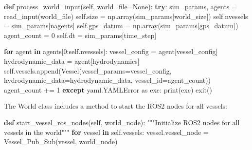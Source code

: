 \documentclass[
  letterpaper,
  DIV=11,
  numbers=noendperiod]{scrreprt}
\newenvironment{Shaded}{\begin{snugshade}}{\end{snugshade}}
\newcommand{\BuiltInTok}[1]{\textcolor[rgb]{0.00,0.23,0.31}{#1}}
\newcommand{\CommentTok}[1]{\textcolor[rgb]{0.37,0.37,0.37}{#1}}
\newcommand{\ControlFlowTok}[1]{\textcolor[rgb]{0.00,0.23,0.31}{\textbf{#1}}}
\newcommand{\DecValTok}[1]{\textcolor[rgb]{0.68,0.00,0.00}{#1}}
\newcommand{\ImportTok}[1]{\textcolor[rgb]{0.00,0.46,0.62}{#1}}
\newcommand{\KeywordTok}[1]{\textcolor[rgb]{0.00,0.23,0.31}{\textbf{#1}}}
\newcommand{\NormalTok}[1]{\textcolor[rgb]{0.00,0.23,0.31}{#1}}
\newcommand{\OperatorTok}[1]{\textcolor[rgb]{0.37,0.37,0.37}{#1}}
\newcommand{\StringTok}[1]{\textcolor[rgb]{0.13,0.47,0.30}{#1}}
\newcommand{\VariableTok}[1]{\textcolor[rgb]{0.07,0.07,0.07}{#1}}
\begin{document}
\begin{Shaded}
\begin{Highlighting}[]
\KeywordTok{def}\NormalTok{ process\_world\_input(}\VariableTok{self}\NormalTok{, world\_file}\OperatorTok{=}\VariableTok{None}\NormalTok{):}
    \ControlFlowTok{try}\NormalTok{:}
\NormalTok{        sim\_params, agents }\OperatorTok{=}\NormalTok{ read\_input(world\_file)}
        \VariableTok{self}\NormalTok{.size }\OperatorTok{=}\NormalTok{ np.array(sim\_params[}\StringTok{\textquotesingle{}world\_size\textquotesingle{}}\NormalTok{])}
        \VariableTok{self}\NormalTok{.nvessels }\OperatorTok{=}\NormalTok{ sim\_params[}\StringTok{\textquotesingle{}nagents\textquotesingle{}}\NormalTok{]}
        \VariableTok{self}\NormalTok{.gps\_datum }\OperatorTok{=}\NormalTok{ np.array(sim\_params[}\StringTok{\textquotesingle{}gps\_datum\textquotesingle{}}\NormalTok{])}
\NormalTok{        agent\_count }\OperatorTok{=} \DecValTok{0}
        \VariableTok{self}\NormalTok{.dt }\OperatorTok{=}\NormalTok{ sim\_params[}\StringTok{\textquotesingle{}time\_step\textquotesingle{}}\NormalTok{]}
        
        \ControlFlowTok{for}\NormalTok{ agent }\KeywordTok{in}\NormalTok{ agents[}\DecValTok{0}\NormalTok{:}\VariableTok{self}\NormalTok{.nvessels]:}
\NormalTok{            vessel\_config }\OperatorTok{=}\NormalTok{ agent[}\StringTok{\textquotesingle{}vessel\_config\textquotesingle{}}\NormalTok{]}
\NormalTok{            hydrodynamic\_data }\OperatorTok{=}\NormalTok{ agent[}\StringTok{\textquotesingle{}hydrodynamics\textquotesingle{}}\NormalTok{]}
            \VariableTok{self}\NormalTok{.vessels.append(Vessel(vessel\_params}\OperatorTok{=}\NormalTok{vessel\_config, }
\NormalTok{                                      hydrodynamic\_data}\OperatorTok{=}\NormalTok{hydrodynamic\_data, }
\NormalTok{                                      vessel\_id}\OperatorTok{=}\NormalTok{agent\_count))}
\NormalTok{            agent\_count }\OperatorTok{+=} \DecValTok{1}
    \ControlFlowTok{except}\NormalTok{ yaml.YAMLError }\ImportTok{as}\NormalTok{ exc:}
        \BuiltInTok{print}\NormalTok{(exc)}
\NormalTok{        exit()}
\end{Highlighting}
\end{Shaded}

The World class includes a method to start the ROS2 nodes for all
vessels:

\begin{Shaded}
\begin{Highlighting}[]
\KeywordTok{def}\NormalTok{ start\_vessel\_ros\_nodes(}\VariableTok{self}\NormalTok{, world\_node):}
    \CommentTok{"""Initialize ROS2 nodes for all vessels in the world"""}
    \ControlFlowTok{for}\NormalTok{ vessel }\KeywordTok{in} \VariableTok{self}\NormalTok{.vessels:}
\NormalTok{        vessel.vessel\_node }\OperatorTok{=}\NormalTok{ Vessel\_Pub\_Sub(vessel, world\_node)}
\end{Highlighting}
\end{Shaded}
\end{document}

